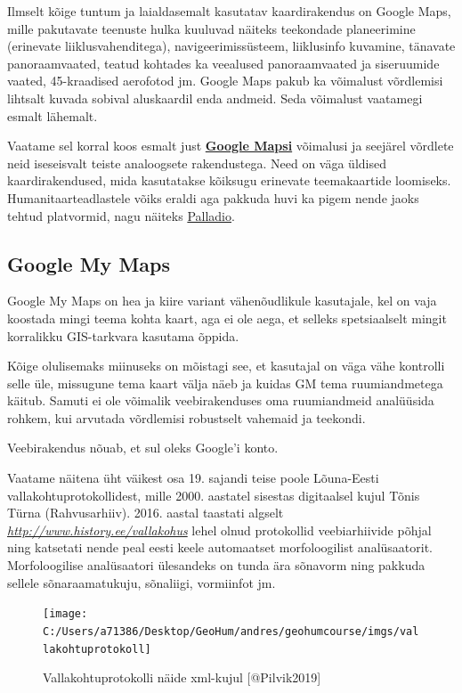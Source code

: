 \documentclass[
]{book}
\begin{document}
Ilmselt kõige tuntum ja laialdasemalt kasutatav kaardirakendus on Google Maps, mille pakutavate teenuste hulka kuuluvad näiteks teekondade planeerimine (erinevate liiklusvahenditega), navigeerimissüsteem, liiklusinfo kuvamine, tänavate panoraamvaated, teatud kohtades ka veealused panoraamvaated ja siseruumide vaated, 45-kraadised aerofotod jm. Google Maps pakub ka võimalust võrdlemisi lihtsalt kuvada sobival aluskaardil enda andmeid. Seda võimalust vaatamegi esmalt lähemalt.

Vaatame sel korral koos esmalt just \textbf{\href{https://www.google.com/mymaps/}{Google Mapsi}} võimalusi ja seejärel võrdlete neid iseseisvalt teiste analoogsete rakendustega. Need on väga üldised kaardirakendused, mida kasutatakse kõiksugu erinevate teemakaartide loomiseks. Humanitaarteadlastele võiks eraldi aga pakkuda huvi ka pigem nende jaoks tehtud platvormid, nagu näiteks \href{http://hdlab.stanford.edu/palladio/}{Palladio}.

\hypertarget{google-my-maps}{%
\subsection{Google My Maps}\label{google-my-maps}}

Google My Maps on hea ja kiire variant vähenõudlikule kasutajale, kel on vaja koostada mingi teema kohta kaart, aga ei ole aega, et selleks spetsiaalselt mingit korralikku GIS-tarkvara kasutama õppida.

Kõige olulisemaks miinuseks on mõistagi see, et kasutajal on väga vähe kontrolli selle üle, missugune tema kaart välja näeb ja kuidas GM tema ruumiandmetega käitub. Samuti ei ole võimalik veebirakenduses oma ruumiandmeid analüüsida rohkem, kui arvutada võrdlemisi robustselt vahemaid ja teekondi.

Veebirakendus nõuab, et sul oleks Google'i konto.

Vaatame näitena üht väikest osa 19. sajandi teise poole Lõuna-Eesti vallakohtuprotokollidest, mille 2000. aastatel sisestas digitaalsel kujul Tõnis Türna (Rahvusarhiiv). 2016. aastal taastati algselt \emph{\url{http://www.history.ee/vallakohus}} lehel olnud protokollid veebiarhiivide põhjal ning katsetati nende peal eesti keele automaatset morfoloogilist analüsaatorit. Morfoloogilise analüsaatori ülesandeks on tunda ära sõnavorm ning pakkuda sellele sõnaraamatukuju, sõnaliigi, vormiinfot jm.

\begin{figure}

{\centering \texttt{[image: C:/Users/a71386/Desktop/GeoHum/andres/geohumcourse/imgs/vallakohtuprotokoll]} 

}

\caption{Vallakohtuprotokolli näide xml-kujul [@Pilvik2019]}\label{fig:protokoll}
\end{figure}
\end{document}
